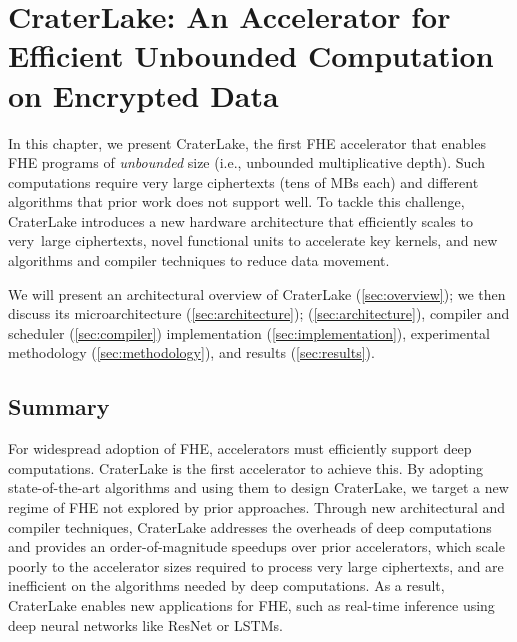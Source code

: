 \documentclass[12pt,twoside]{mitthesis}
\begin{document}
\chapter{CraterLake: An Accelerator for Efficient Unbounded Computation on Encrypted Data}\label{ch:craterlake}

In this chapter, we present CraterLake, the first FHE accelerator that enables
FHE programs of \emph{unbounded} size (i.e., unbounded multiplicative depth).
Such computations require very large ciphertexts (tens of MBs each) and
different algorithms that prior work does not support well. To tackle this
challenge, CraterLake introduces a new hardware architecture that efficiently
scales to very~large ciphertexts, novel functional units to accelerate key
kernels, and new algorithms and compiler techniques to reduce data movement.

We will present an architectural overview of CraterLake
(\autoref{sec:overview}); we then discuss its microarchitecture
(\autoref{sec:architecture}); (\autoref{sec:architecture}), compiler and
scheduler (\autoref{sec:compiler}) implementation
(\autoref{sec:implementation}), experimental methodology
(\autoref{sec:methodology}), and results (\autoref{sec:results}).








\section{Summary}

For widespread adoption of FHE, accelerators must efficiently support deep
computations. CraterLake is the first accelerator to achieve this. By adopting
state-of-the-art algorithms and using them to design CraterLake, we target a
new regime of FHE not explored by prior approaches. Through new architectural
and compiler techniques, CraterLake addresses the overheads of deep
computations and provides an order-of-magnitude speedups over prior
accelerators, which scale poorly to the accelerator sizes required to process
very large ciphertexts, and are inefficient on the algorithms needed by deep
computations. As a result, CraterLake enables new applications for FHE, such as
real-time inference using deep neural networks like ResNet or LSTMs.




\begin{singlespacing}

\end{singlespacing}
\end{document}
